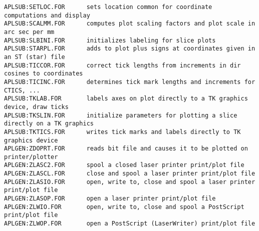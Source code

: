 \begin{verbatim}
APLSUB:SETLOC.FOR      sets location common for coordinate computations and display
APLSUB:SCALMM.FOR      computes plot scaling factors and plot scale in arc sec per mm
APLSUB:SLBINI.FOR      initializes labeling for slice plots
APLSUB:STARPL.FOR      adds to plot plus signs at coordinates given in an ST (star) file
APLSUB:TICCOR.FOR      correct tick lengths from increments in dir cosines to coordinates
APLSUB:TICINC.FOR      determines tick mark lengths and increments for CTICS, ...
APLSUB:TKLAB.FOR       labels axes on plot directly to a TK graphics device, draw ticks
APLSUB:TKSLIN.FOR      initialize parameters for plotting a slice directly on a TK graphics
APLSUB:TKTICS.FOR      writes tick marks and labels directly to TK graphics device
APLGEN:ZDOPRT.FOR      reads bit file and causes it to be plotted on printer/plotter
APLGEN:ZLASC2.FOR      spool a closed laser printer print/plot file
APLGEN:ZLASCL.FOR      close and spool a laser printer print/plot file
APLGEN:ZLASIO.FOR      open, write to, close and spool a laser printer print/plot file
APLGEN:ZLASOP.FOR      open a laser printer print/plot file
APLGEN:ZLWIO.FOR       open, write to, close and spool a PostScript print/plot file
APLGEN:ZLWOP.FOR       open a PostScript (LaserWriter) print/plot file
\end{verbatim}
 
